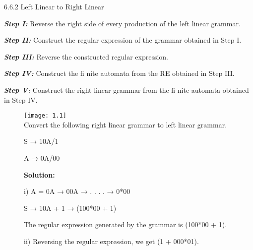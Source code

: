 \documentclass[10pt,a4paper]{book}
\begin{document}
\begin{flushleft}
\!\!\!\!\!\large 6.6.2 \; \textsf{Left Linear to Right Linear}
\end{flushleft}

\begin{flushleft}
\!\!\!\!\!\textbf{\emph{Step I:}} Reverse the right side of every production of the left linear grammar.

\!\!\!\!\!\textbf{\emph{Step II:}} Construct the regular expression of the grammar obtained in Step I.

\!\!\!\!\!\textbf{\emph{Step III:}} Reverse the constructed regular expression.

\!\!\!\!\!\textbf{\emph{Step IV:}} Construct the fi nite automata from the RE obtained in Step III.

\!\!\!\!\!\textbf{\emph{Step V:}} Construct the right linear grammar from the fi nite automata obtained in Step IV.
\end{flushleft}

\begin{flushleft}
\begin{figure}[h]
  \texttt{[image: 1.1]}\\ Convert the following right linear grammar to left linear grammar.
  
  \qquad
  
  \qquad\qquad\qquad\qquad\qquad S → 10A/1
  
  \qquad\qquad\qquad\qquad\qquad A → 0A/00
  
  \qquad
  
  \textsf{\textbf{Solution:}}

  \qquad
  
  i) A = 0A → 00A → . . . . → 0*00
  
   \qquad
  
  \qquad\qquad\qquad\qquad\qquad S → 10A + 1 → (100*00 + 1)
  
   \qquad
  
  \quad The regular expression generated by the grammar is (100*00 + 1).
  
  ii) Reversing the regular expression, we get (1 + 000*01).
\end{figure}
\end{flushleft}
\end{document}
